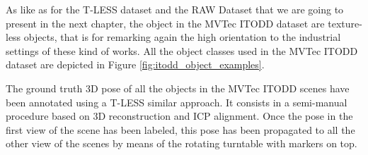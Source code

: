 As like as for the T-LESS dataset and the RAW Dataset that we are going to present in the next chapter, the object in the MVTec ITODD dataset are texture-less objects, that is for remarking again the high orientation to the industrial settings of these kind of works. All the object classes used in the MVTec ITODD dataset are depicted in Figure \ref{fig:itodd_object_examples}.

The ground truth 3D pose of all the objects in the MVTec ITODD scenes have been annotated using a T-LESS similar approach. It consists in a semi-manual procedure based on 3D reconstruction and ICP alignment. Once the pose in the first view of the scene has been labeled, this pose has been propagated to all the other view of the scenes by means of the rotating turntable with markers on top.